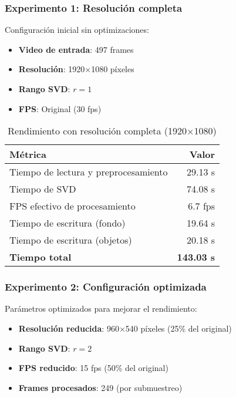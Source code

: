 \documentclass[12pt]{article}
\begin{document}
\subsubsection{Experimento 1: Resolución completa}

Configuración inicial sin optimizaciones:
\begin{itemize}
    \item \textbf{Video de entrada}: 497 frames
    \item \textbf{Resolución}: 1920×1080 píxeles
    \item \textbf{Rango SVD}: $r = 1$
    \item \textbf{FPS}: Original (30 fps)
\end{itemize}

\begin{table}[h]
\centering
\begin{tabular}{|l|r|}
\hline
\textbf{Métrica} & \textbf{Valor} \\
\hline
Tiempo de lectura y preprocesamiento & 29.13 s \\
Tiempo de SVD & 74.08 s \\
FPS efectivo de procesamiento & 6.7 fps \\
Tiempo de escritura (fondo) & 19.64 s \\
Tiempo de escritura (objetos) & 20.18 s \\
\textbf{Tiempo total} & \textbf{143.03 s} \\
\hline
\end{tabular}
\caption{Rendimiento con resolución completa (1920×1080)}
\label{tab:exp1}
\end{table}

\subsubsection{Experimento 2: Configuración optimizada}

Parámetros optimizados para mejorar el rendimiento:
\begin{itemize}
    \item \textbf{Resolución reducida}: 960×540 píxeles (25\% del original)
    \item \textbf{Rango SVD}: $r = 2$
    \item \textbf{FPS reducido}: 15 fps (50\% del original)
    \item \textbf{Frames procesados}: 249 (por submuestreo)
\end{itemize}
\end{document}
